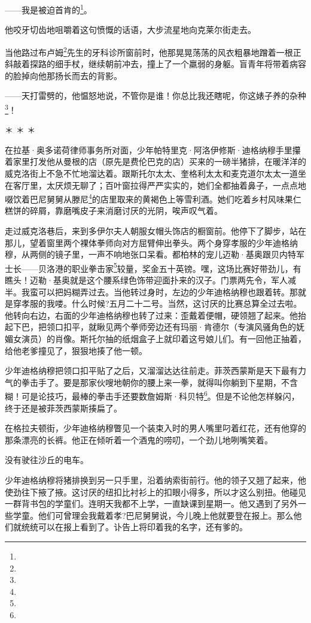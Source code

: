 \par ——我是被迫首肯的\footnote{}。
\par 他咬牙切齿地咀嚼着这句愤慨的话语，大步流星地向克莱尔街走去。
\par 当他路过布卢姆\footnote{}先生的牙科诊所窗前时，他那晃晃荡荡的风衣粗暴地蹭着一根正斜敲着探路的细手杖，继续朝前冲去，撞上了一个羸弱的身躯。盲青年将带着病容的脸掉向他那扬长而去的背影。
\par ——天打雷劈的，他愠怒地说，不管你是谁！你总比我还瞎呢，你这婊子养的杂种\footnote{}！
\par ＊ ＊ ＊
\par 在拉基·奥多诺荷律师事务所对面，少年帕特里克·阿洛伊修斯·迪格纳穆手里攥着家里打发他从曼根的店（原先是费伦巴克的店）买来的一磅半猪排，在暖洋洋的威克洛街上不急不忙地溜达着。跟斯托尔太太、奎格利太太和麦克道尔太太一道坐在客厅里，太厌烦无聊了；百叶窗拉得严严实实的，她们全都抽着鼻子，一点点地啜饮着巴尼舅舅从滕尼\footnote{}的店里取来的黄褐色上等雪利酒。她们吃着乡村风味果仁糕饼的碎屑，靠磨嘴皮子来消磨讨厌的光阴，唉声叹气着。
\par 走过威克洛巷后，来到多伊尔夫人朝服女帽头饰店的橱窗前。他停下了脚步，站在那儿，望着窗里两个裸体拳师向对方屈臂伸出拳头。两个身穿孝服的少年迪格纳穆，从两侧的镜子里，一声不响地张口呆看。都柏林的宠儿迈勒·基奥跟贝内特军士长——贝洛港的职业拳击家\footnote{}较量，奖金五十英镑。嘿，这场比赛好带劲儿，有瞧头！迈勒·基奥就是这个腰系绿色饰带迎面扑来的汉子。门票两先令，军人减半。我蛮可以把妈糊弄过去。当他转过身时，左边的少年迪格纳穆也跟着转。那就是穿孝服的我喽。什么时候?五月二十二号。当然，这讨厌的比赛总算全过去啦。他转向右边，右面的少年迪格纳穆也转了过来：歪戴着便帽，硬领翘了起来。他抬起下巴，把领口扣平，就瞅见两个拳师旁边还有玛丽·肯德尔（专演风骚角色的妩媚女演员）的肖像。斯托尔抽的纸烟盒子上就印着这号娘儿们。有一回他正抽着，给他老爹撞见了，狠狠地揍了他一顿。
\par 少年迪格纳穆把领口扣平贴了之后，又溜溜达达往前走。菲茨西蒙斯是天下最有力气的拳击手了。要是那家伙嗖地朝你的腰上来一拳，就得叫你躺到下星期，不含糊！可是论技巧，最棒的拳击手还要数詹姆斯·科贝特\footnote{}。但是不论他怎样躲闪，终于还是被菲茨西蒙斯揍扁了。
\par 在格拉夫顿街，少年迪格纳穆瞥见一个装束入时的男人嘴里叼着红花，还有他穿的那条漂亮的长裤。他正在倾听着一个酒鬼的唠叨，一个劲儿地咧嘴笑着。
\par 没有驶往沙丘的电车。
\par 少年迪格纳穆将猪排换到另一只手里，沿着纳索街前行。他的领子又翘了起来，他使劲往下掖了掖。这讨厌的纽扣比衬衫上的扣眼小得多，所以才这么别扭。他碰见一群背书包的学童们。连明天我都不上学，一直缺课到星期一。他又遇到了另外一些学童。他们可曾理会我戴着孝?巴尼舅舅说，今儿晚上他就要登在报上。那么他们就统统可以在报上看到了。讣告上将印着我的名字，还有爹的。

